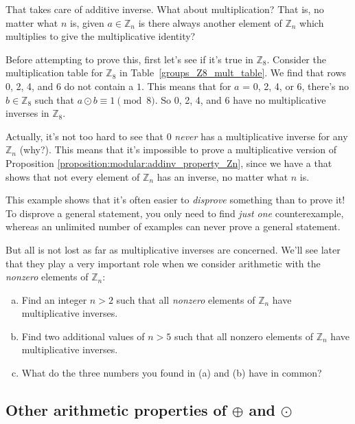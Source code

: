 That takes care of additive inverse. What about multiplication? That is, no matter what $n$ is, given $a \in {\mathbb Z}_n$ is there always another element of ${\mathbb Z}_n$ which multiplies to give the multiplicative identity?  

Before attempting to prove this, first let's see if it's true in ${\mathbb Z}_8$. Consider the multiplication table for ${\mathbb Z}_8$ in Table~\ref{groups_Z8_mult_table}.  We find that  rows 0, 2, 4, and 6 do not contain a $1$. This means that  for $a$ = 0, 2,  4, or 6, there's no $b \in {\mathbb Z}_8$ such that $a \odot b \equiv 1 \pmod{ 8}$.  So 0, 2, 4, and 6 have no multiplicative inverses  in ${\mathbb Z}_8$. 

Actually, it's not too hard to see that 0 \emph{never} has a multiplicative inverse for any ${\mathbb Z}_n$ (why?). This means that it's impossible to prove a multiplicative version of Proposition \ref{proposition:modular:addinv_property_Zn}, since we have a  that shows that not every element of ${\mathbb Z}_n$ has an inverse, no matter what $n$ is.

\begin{rem}
This example shows that it's often easier to \emph{disprove} something than to prove it!  To disprove a general statement, you only need to find \emph{just one} counterexample, whereas an unlimited number of examples can never prove a general statement.
\end{rem}

But all is not lost as far as multiplicative inverses are concerned. We'll see later that they play a very important role when we consider arithmetic with the \emph{nonzero} elements of ${\mathbb Z}_n$:

\begin{exercise}{60}
\begin{enumerate}[(a)]
\item
Find an integer $n>2$ such that all \emph{nonzero} elements of ${\mathbb Z}_n$ have multiplicative inverses.
\item
Find two additional values of $n>5$ such that all nonzero elements of ${\mathbb Z}_n$ have multiplicative inverses.
\item
What do the three numbers you found in (a) and (b) have in common?
\end{enumerate}
\end{exercise}

\subsection{Other arithmetic properties of $\oplus$ and $\odot$}

